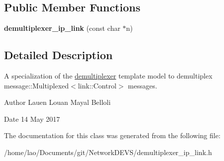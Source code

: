 \subsection*{Public Member Functions}
\begin{DoxyCompactItemize}
\item 
{\bfseries demultiplexer\+\_\+ip\+\_\+link} (const char $\ast$n)\hypertarget{classdemultiplexer__ip__link_aec9879ae23d1a8c51d7d73f9c8b3e2a5}{}\label{classdemultiplexer__ip__link_aec9879ae23d1a8c51d7d73f9c8b3e2a5}

\end{DoxyCompactItemize}


\subsection{Detailed Description}
A specialization of the \hyperlink{classdemultiplexer}{demultiplexer} template model to demultiplex message\+::\+Multiplexed$<$link\+::\+Control$>$ messages. 

\begin{DoxyAuthor}{Author}
Lauen Louan Mayal Belloli 
\end{DoxyAuthor}
\begin{DoxyDate}{Date}
14 May 2017 
\end{DoxyDate}


The documentation for this class was generated from the following file\+:\begin{DoxyCompactItemize}
\item 
/home/lao/\+Documents/git/\+Network\+D\+E\+V\+S/demultiplexer\+\_\+ip\+\_\+link.\+h\end{DoxyCompactItemize}
